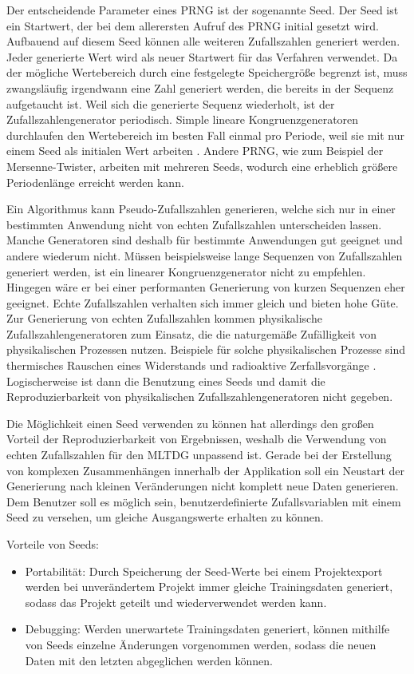 Der entscheidende Parameter eines \ac{PRNG} ist der sogenannte Seed. Der Seed ist ein Startwert, der bei dem allerersten Aufruf des \ac{PRNG} initial gesetzt wird. Aufbauend auf diesem Seed können alle weiteren Zufallszahlen generiert werden. Jeder generierte Wert wird als neuer Startwert für das Verfahren verwendet. Da der mögliche Wertebereich durch eine festgelegte Speichergröße begrenzt ist, muss zwangsläufig irgendwann eine Zahl generiert werden, die bereits in der Sequenz aufgetaucht ist. Weil sich die generierte Sequenz wiederholt, ist der Zufallszahlengenerator periodisch. Simple lineare Kongruenzgeneratoren durchlaufen den Wertebereich im besten Fall einmal pro Periode, weil sie mit nur einem Seed als initialen Wert arbeiten \cite{prng}. Andere \ac{PRNG}, wie zum Beispiel der Mersenne-Twister, arbeiten mit mehreren Seeds, wodurch eine erheblich größere Periodenlänge erreicht werden kann.

Ein Algorithmus kann Pseudo-Zufallszahlen generieren, welche sich nur in einer bestimmten Anwendung nicht von echten Zufallszahlen unterscheiden lassen. Manche Generatoren sind deshalb für bestimmte Anwendungen gut geeignet und andere wiederum nicht. Müssen beispielsweise lange Sequenzen von Zufallszahlen generiert werden, ist ein linearer Kongruenzgenerator nicht zu empfehlen. Hingegen wäre er bei einer performanten Generierung von kurzen Sequenzen eher geeignet. Echte Zufallszahlen verhalten sich immer gleich und bieten hohe Güte. Zur Generierung von echten Zufallszahlen kommen physikalische Zufallszahlengeneratoren zum Einsatz, die die naturgemäße Zufälligkeit von physikalischen Prozessen nutzen. Beispiele für solche physikalischen Prozesse sind thermisches Rauschen eines Widerstands und radioaktive Zerfallsvorgänge \cite{prng}. Logischerweise ist dann die Benutzung eines Seeds und damit die Reproduzierbarkeit von physikalischen Zufallszahlengeneratoren nicht gegeben.

Die Möglichkeit einen Seed verwenden zu können hat allerdings den großen Vorteil der Reproduzierbarkeit von Ergebnissen, weshalb die Verwendung von echten Zufallszahlen für den \ac{MLTDG} unpassend ist. Gerade bei der Erstellung von komplexen Zusammenhängen innerhalb der Applikation soll ein Neustart der Generierung nach kleinen Veränderungen nicht komplett neue Daten generieren. Dem Benutzer soll es möglich sein, benutzerdefinierte Zufallsvariablen mit einem Seed zu versehen, um gleiche Ausgangswerte erhalten zu können.

Vorteile von Seeds:
\begin{itemize}
    \item Portabilität: Durch Speicherung der Seed-Werte bei einem Projektexport werden bei unverändertem Projekt immer gleiche Trainingsdaten generiert, sodass das Projekt geteilt und wiederverwendet werden kann. 
    \item Debugging: Werden unerwartete Trainingsdaten generiert, können mithilfe von Seeds einzelne Änderungen vorgenommen werden, sodass die neuen Daten mit den letzten abgeglichen werden können.
\end{itemize}

